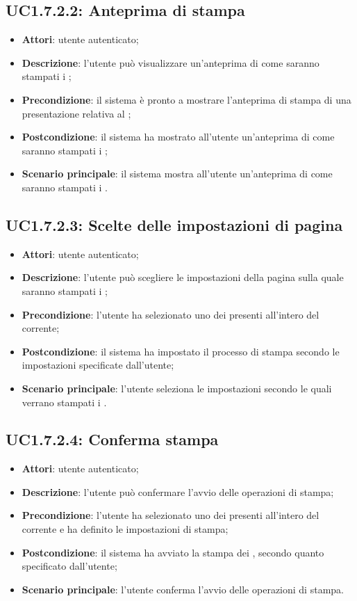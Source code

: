 \subsection{UC1.7.2.2: Anteprima di stampa}
\label{UC1.7.2.2}
\begin{itemize}
\item \textbf{Attori}: utente autenticato;
\item \textbf{Descrizione}: l'utente può visualizzare un'anteprima di come saranno stampati i ;
\item \textbf{Precondizione}: il sistema è pronto a mostrare l'anteprima di stampa di una presentazione relativa al ;
\item \textbf{Postcondizione}: il sistema ha mostrato all'utente un'anteprima di come saranno stampati i ;
\item \textbf{Scenario principale}:
il sistema mostra all'utente un'anteprima di come saranno stampati i .
\end{itemize}
\subsection{UC1.7.2.3: Scelte delle impostazioni di pagina}
\label{UC1.7.2.3}
\begin{itemize}
\item \textbf{Attori}: utente autenticato;
\item \textbf{Descrizione}: l'utente può scegliere le impostazioni della pagina sulla quale saranno stampati i ;
\item \textbf{Precondizione}: l'utente ha selezionato uno dei  presenti all'intero del  corrente;
\item \textbf{Postcondizione}: il sistema ha impostato il processo di stampa secondo le impostazioni specificate dall'utente;
\item \textbf{Scenario principale}:
l'utente seleziona le impostazioni secondo le quali verrano stampati i .
\end{itemize}
\subsection{UC1.7.2.4: Conferma stampa}
\label{UC1.7.2.4}
\begin{itemize}
\item \textbf{Attori}: utente autenticato;
\item \textbf{Descrizione}: l'utente può confermare l'avvio delle operazioni di stampa;
\item \textbf{Precondizione}: l'utente ha selezionato uno dei  presenti all'intero del  corrente e ha definito le impostazioni di stampa;
\item \textbf{Postcondizione}: il sistema ha avviato la stampa dei , secondo quanto specificato dall'utente;
\item \textbf{Scenario principale}:
l'utente conferma l'avvio delle operazioni di stampa.
\end{itemize}
